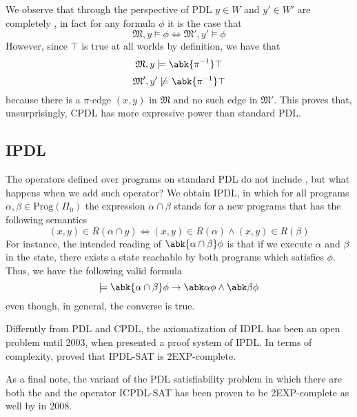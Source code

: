\documentclass[a4paper, 12pt]{report}
\begin{document}
    We observe that through the perspective of PDL $y \in W$ and $y' \in W'$ are completely , in fact for any formula $\phi$ it is the case that $$\mathfrak M, y \models \phi \iff \mathfrak M', y' \models \phi$$ However, since $\top$ is true at all worlds by definition, we have that $$\mathfrak M, y \models \abk{\pi^{-1}} \top$$ $$\mathfrak M', y' \not\models \abk{\pi^{-1}} \top$$ because there is a $\pi$-edge $(x, y)$ in $\mathfrak M$ and no such edge in $\mathfrak M'$. This proves that, unsurprisingly, CPDL has more expressive power than standard PDL.

    \subsection{IPDL}

    The operators defined over programs on standard PDL do not include , but what happens when we add such operator? We obtain IPDL, in which for all programs $\alpha, \beta \in \mathrm{Prog}(\Pi_0)$ the expression $\alpha \cap \beta$ stands for a new programs that has the following semantics $$(x, y) \in R(\alpha \cap y) \iff (x, y) \in R(\alpha) \land (x, y) \in R(\beta)$$ For instance, the intended reading of $\abk{\alpha \cap \beta} \phi$ is that if we execute $\alpha$ and $\beta$ in the  state, there exists a state reachable by both programs which satisfies $\phi$. Thus, we have the following valid formula $$\models \abk{\alpha \cap \beta} \phi \to \abk \alpha \phi \land \abk \beta \phi$$ even though, in general, the converse is  true.

    Differntly from PDL and CPDL, the axiomatization of IDPL has been an open problem until 2003, when \textcite{balbiani} presented a  proof system of IPDL. In terms of complexity, \textcite{ipdl} proved that IPDL-SAT is \textsf{2EXP}-complete.

    As a final note, the variant of the PDL satisfiability problem in which there are both the  and the  operator ICPDL-SAT has been proven to be \textsf{2EXP}-complete as well by \textcite{icpdl} in 2008.

\end{document}

